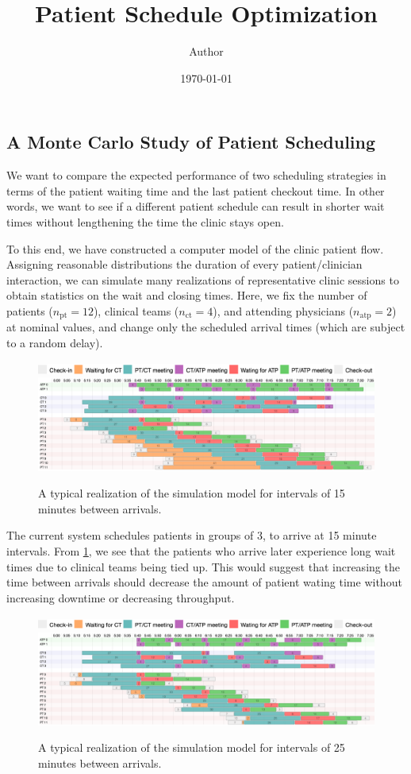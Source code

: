 \documentclass[11pt]{article}
\title{Patient Schedule Optimization}
\author{Author}
\date{\today}
\begin{document}
\subsection*{A Monte Carlo Study of Patient Scheduling}

We want to compare the expected performance of two scheduling strategies in terms of the patient waiting time and the last patient checkout time. In other words, we want to see if a different patient schedule can result in shorter wait times without lengthening the time the clinic stays open.

To this end, we have constructed a computer model of the clinic patient flow. Assigning reasonable distributions the duration of every patient/clinician interaction, we can simulate many realizations of representative clinic sessions to obtain statistics on the wait and closing times. Here, we fix the number of patients ($n_\text{pt}=12$), clinical teams ($n_\text{ct}=4$), and attending physicians ($n_\text{atp}=2$) at nominal values, and change only the scheduled arrival times (which are subject to a random delay).
\begin{figure}[H]
  \includegraphics[width=0.75\linewidth]{legend.png}\\[0.5em]
  \includegraphics[width=\linewidth]{3_15.png}
  \caption{A typical realization of the simulation model for intervals of 15 minutes between arrivals.}
  \label{fig:gannt-15}
\end{figure}
The current system schedules patients in groups of 3, to arrive at 15 minute intervals. From \cref{fig:gannt-15}, we see that the patients who arrive later experience long wait times due to clinical teams being tied up. This would suggest that increasing the time between arrivals should decrease the amount of patient wating time without increasing downtime or decreasing throughput.
\begin{figure}[H]
  \includegraphics[width=0.75\linewidth]{legend.png}\\[0.5em]
  \includegraphics[width=\linewidth]{3_25.png}
  \caption{A typical realization of the simulation model for intervals of 25 minutes between arrivals.}
  \label{fig:gannt-25}
\end{figure}
\end{document}

